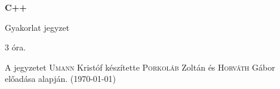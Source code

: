 \documentclass[a4paper,11.5pt,table]{article}
\begin{document}
	\setlength\parindent{0pt}
	\def\<{<\hspace{0mm}<}
	
	\theoremstyle{definition}
	\newtheorem{note}{Megjegyzés}[subsection]
  \newtheorem{example}{Példa}[subsection]
  \newtheorem{definition}{Definíció}[subsection]

	
	\begin{center}
		{\LARGE\textbf{C++}}
		
		{\Large Gyakorlat jegyzet}
		
		3 óra.
	\end{center}
	A jegyzetet \textsc{Umann} Kristóf készítette \textsc{Porkoláb} Zoltán és \textsc{Horváth} Gábor előadása alapján. (\today)
%
%	
%	
%	
%	
%	
\end{document}
